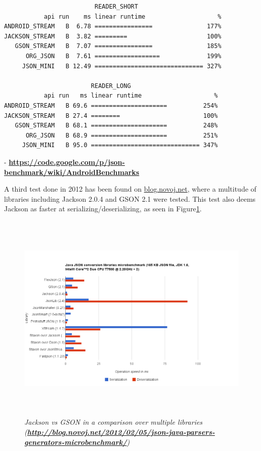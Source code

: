 \documentclass{article}
\begin{document}
\begin{enumerate}
\begin{verbatim}
                         READER_SHORT                        
           api run    ms linear runtime                    % 
ANDROID_STREAM   B  6.78 ================               177% 
JACKSON_STREAM   B  3.82 =========                      100% 
   GSON_STREAM   B  7.07 ================               185% 
      ORG_JSON   B  7.61 ==================             199% 
     JSON_MINI   B 12.49 ============================== 327% 

                        READER_LONG                         
           api run   ms linear runtime                    % 
ANDROID_STREAM   B 69.6 =====================          254% 
JACKSON_STREAM   B 27.4 ========                       100% 
   GSON_STREAM   B 68.1 =====================          248% 
      ORG_JSON   B 68.9 =====================          251% 
     JSON_MINI   B 95.0 ============================== 347% 
  \end{verbatim}  -
  \textbf{\url{https://code.google.com/p/json-benchmark/wiki/AndroidBenchmarks}}\newline
   
  A third test done in 2012 has been found on \url{blog.novoj.net}, where a
  multitude of libraries including Jackson 2.0.4 and GSON 2.1 were tested. This
  test also deems Jackson as faster at serializing/deserializing, as seen in
  Figure\ref{fig:jacksonvsgson2}.\newline
  
  \begin{figure}
  \includegraphics[height=4in,width=6.23in]{./images/benchmarks/oimg.png}
  \caption{\small \sl Jackson vs GSON in a comparison over multiple libraries
  (\textbf{\url{http://blog.novoj.net/2012/02/05/json-java-parsers-generators-microbenchmark/}})}
  \label{fig:jacksonvsgson2}
  \end{figure}
  

\end{enumerate}
\end{document}
